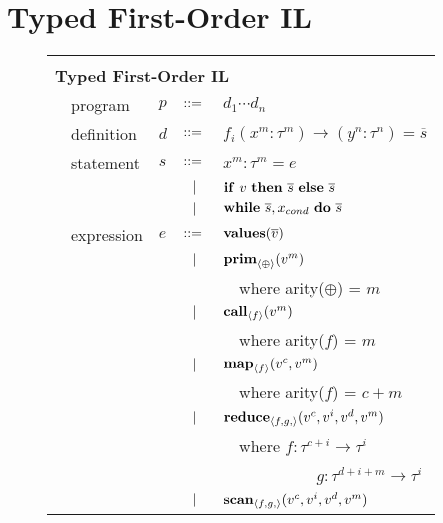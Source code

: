 \documentclass[preprint]{sigplanconf}
\begin{document}
\section{Typed First-Order IL}
\begin{figure}[h!]
  \begin{tabular}{| m{0.01cm}m{1.3cm}m{0.1cm}m{0.2cm}p{5.0cm} |}
  \hline
    & & & &\\
   \multicolumn{5}{|l|}{\textbf{Typed First-Order IL}}  \\[4pt]
  & program & $p$ &  $::=$   &  $d_1 \cdots d_n $ \\[4pt]
  & definition & $d$ & $::=$ & $f_i(x^m : \tau^m) \rightarrow (y^n : \tau^n) = \overline{s} $ \\[4pt]
  & statement  & $s$ & $::=$ & $x^m : \tau^m = e $\\[2pt]
  &            &     & $\ \ | \ \ $    & $\mbox{\textbf{if}} ~v~ \mbox{\textbf{then}} ~\overline{s}~ \mbox{\textbf{else}} ~ \overline{s}$ \\[2pt]
  &            &     & $\ \ | \ \ $    & $\mbox{\textbf{while}} ~ \overline{s}, x_{cond} ~ \mbox{\textbf{do}} ~ \overline{s} ~  $ \\[4pt]
  & expression & $e$ & $::=$ & $\mbox{\textbf{values}}(\overline{v})$ \\[2pt]
  &            &     & $\ \ | \ \ $    & $\mbox{\textbf{prim}}_{\left\langle \oplus \right\rangle }(v^m)$ \\[1.5pt]
  &            &     &           & ~~\small{where arity($\oplus$) = $m$} \\[2pt]
  &            &     & $\ \ | \ \ $    & $\mbox{\textbf{call}} _{\left\langle f  \right\rangle } (v^m)$ \\[1.5pt] 
  &            &     &           & ~~\small{where arity($f$) = $m$} \\[2pt]
  &            &     & $\ \ | \ \ $    & $\mbox{\textbf{map}} _{\left\langle f \right\rangle}(v^c, v^m)$ \\[1.5pt]
  &            &     &           & ~~\small{where arity($f$) = $c+m$} \\[2pt]
  &            &     & $\ \ | \ \ $    & $\mbox{\textbf{reduce}} _{ \left\langle f, g, \right\rangle } (v^{c}, v^i, v^{d}, v^{m})$ \\[1.5pt]
  &            &     &           & ~~\small{where $f : \tau^{c + i} \rightarrow \tau^i$} \\[1.5pt]
  &            &     &           & ~~~~~~~~~~~ \small{$g : \tau^{d + i + m } \rightarrow \tau^i$} \\[2pt]
  &            &     & $\ \ | \ \ $    & $\mbox{\textbf{scan}} _{ \left\langle f, g, \right\rangle} (v^{c}, v^i, v^{d}, v^{m})$ \\[1.5pt]

\end{tabular}
\end{figure}
\end{document}
